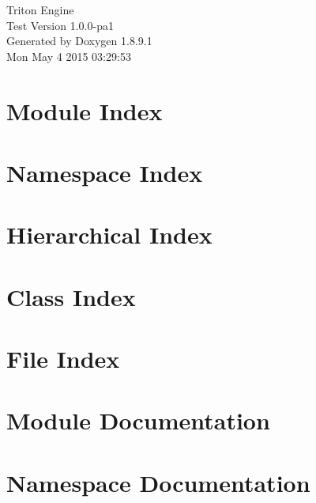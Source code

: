 \documentclass[twoside]{book}
\newcommand{\+}{\discretionary{\mbox{\scriptsize$\hookleftarrow$}}{}{}}
\newcommand{\clearemptydoublepage}{%
  \newpage{\pagestyle{empty}\cleardoublepage}%
}
\begin{document}
\hypersetup{pageanchor=false,
             bookmarks=true,
             bookmarksnumbered=true,
             pdfencoding=unicode
            }
\begin{titlepage}
\vspace*{7cm}
\begin{center}%
{\Large Triton Engine \\[1ex]\large Test Version 1.\+0.\+0-\/pa1 }\\
\vspace*{1cm}
{\large Generated by Doxygen 1.8.9.1}\\
\vspace*{0.5cm}
{\small Mon May 4 2015 03:29:53}\\
\end{center}
\end{titlepage}
\clearemptydoublepage
\tableofcontents
\clearemptydoublepage
{}
\hypersetup{pageanchor=true}

\chapter{Module Index}

\chapter{Namespace Index}

\chapter{Hierarchical Index}

\chapter{Class Index}

\chapter{File Index}

\chapter{Module Documentation}




\chapter{Namespace Documentation}








\end{document}
